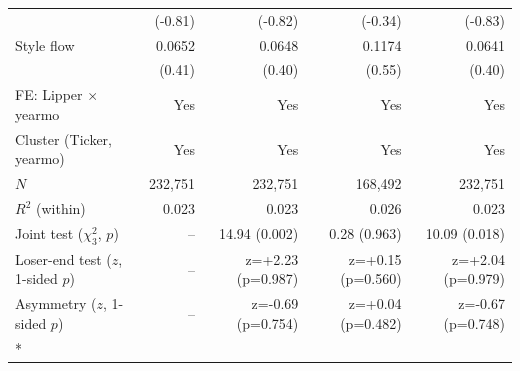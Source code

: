 \begin{ThreePartTable}
\begin{longtable}[t]{@{\extracolsep{\fill}}lrrrr}
 & (-0.81) & (-0.82) & (-0.34) & (-0.83)\\
Style flow & 0.0652 & 0.0648 & 0.1174 & 0.0641\\
 & (0.41) & (0.40) & (0.55) & (0.40)\\
\midrule
FE: Lipper $\times$ yearmo & Yes & Yes & Yes & Yes\\
Cluster (Ticker, yearmo) & Yes & Yes & Yes & Yes\\
$N$ & 232,751 & 232,751 & 168,492 & 232,751\\
$R^2$ (within) & 0.023 & 0.023 & 0.026 & 0.023\\
Joint test ($\chi^2_3$, $p$) & -- & 14.94 (0.002) & 0.28 (0.963) & 10.09 (0.018)\\
Loser-end test ($z$, 1-sided $p$) & -- & z=+2.23 (p=0.987) & z=+0.15 (p=0.560) & z=+2.04 (p=0.979)\\
Asymmetry ($z$, 1-sided $p$) & -- & z=-0.69 (p=0.754) & z=+0.04 (p=0.482) & z=-0.67 (p=0.748)\\*
\end{longtable}
\end{ThreePartTable}
\endgroup{}
